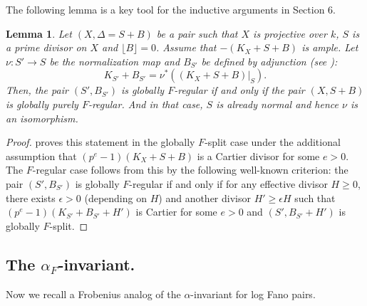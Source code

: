 \documentclass[11pt,reqno]{amsart}
\numberwithin{equation}{section}
\newtheorem{lem}[prop] {Lemma}
\theoremstyle{definition}
\newcommand{\FA}{\alpha_{F}}
\begin{document}
The following lemma is a key tool for the inductive arguments in Section 6.
\begin{lem} \cite[Lemma 2.7]{CTW17} \label{lem:Fadjunction}
    Let $(X, \Delta = S + B)$ be a pair such that $X$ is projective over $k$, $S$ is a prime divisor on $X$ and $\lfloor B \rfloor  = 0$. Assume that $-(K_X + S + B)$ is ample.
    Let $\nu: S' \to S$ be the normalization map and $B_{S'}$ be defined by adjunction (see \cite{das_different_different_different}):
    \[ K_{S'} + B_{S'}  = \nu^*((K_X + S+ B)|_S).  \]
    Then, the pair $(S', B_{S'})$ is globally $F$-regular if and only if the pair $(X, S + B)$ is globally purely $F$-regular. And in that case, $S$ is already normal and hence $\nu$ is an isomorphism. 
\end{lem} 

\begin{proof}
    \cite[Lemma 2.7]{CTW17} proves this statement in the globally $F$-split case under the additional assumption that $(p^e -1) (K_X + S +B)$ is a Cartier divisor for some $e >0$. The $F$-regular case follows from this by the following well-known criterion: the pair $(S', B_{S'})$ is globally $F$-regular if and only if for any effective divisor $H \geq 0 $, there exists $\epsilon > 0$ (depending on $H$) and another divisor $H' \geq  \epsilon H$  such that $(p^e -1) (K_{S'} + B_{S'} + H')$ is Cartier for some $e >0$ and $(S', B_{S'} + H')$ is globally $F$-split.
\end{proof}

\subsection{The $\FA$-invariant.}
Now we recall a Frobenius analog of the $\alpha$-invariant for log Fano pairs.
\end{document}

